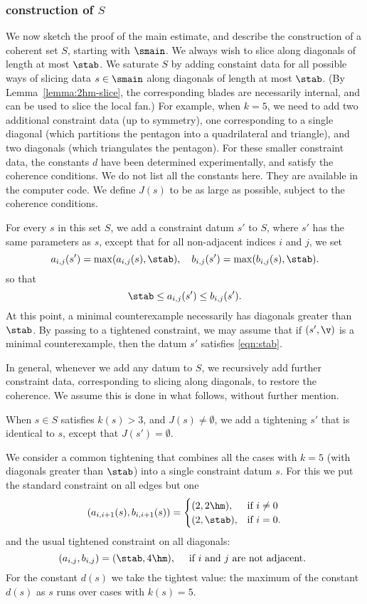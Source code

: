 \subsubsection{construction of $S$}

We now sketch the proof of the main estimate,
and describe the construction of a coherent set $S$, starting with $\smain$.
We always wish to slice along diagonals of length at most $\stab$. 
We saturate $S$ by adding constaint data for
all possible ways of  slicing data $s\in \smain$
along diagonals of length at most $\stab$.  (By Lemma~\ref{lemma:2hm-slice}, the
corresponding blades are necessarily internal, and can be used to
slice the local fan.)  For example, when $k=5$, we need to add two
additional constraint data (up to symmetry), one corresponding to a
single diagonal (which partitions the pentagon into a quadrilateral
and triangle), and two diagonals (which triangulates the pentagon).
For these smaller constraint data, the constants $d$ have been
determined experimentally, and satisfy the coherence conditions.  We
do not list all the constants here.  They are available in the
computer code.  We define $J(s)$ to be as large as possible, subject
to the coherence conditions.  

For every $s$ in this set $S$, 
we add a constraint datum $s'$ to $S$, where $s'$ has
the same parameters as $s$, except that for all non-adjacent indices $i$ and $j$,
we set
\begin{equation}\label{eqn:s'}
a_{i,j}(s') = \max(a_{i,j}(s),\stab),\quad b_{i,j}(s')=\max(b_{i,j}(s),\stab).
\end{equation}
so that
\begin{equation}\label{eqn:stab}
\stab \le a_{i,j}(s')\le b_{i,j}(s').
\end{equation}
At this point,  a minimal counterexample
necessarily has diagonals greater than $\stab$.  By passing to a tightened
constraint, we may assume that if $(s',\v)$ is a minimal counterexample,
then the datum $s'$ satisfies \eqref{eqn:stab}.

In general, whenever we add any datum to $S$, we recursively add
further constraint data, corresponding to slicing along diagonals,
to restore the coherence.  We assume this is done in what follows, without
further mention.

When $s\in S$ satisfies $k(s)>3$, and $J(s)\ne\emptyset$, we add a
tightening $s'$ that is identical to $s$, except that
$J(s')=\emptyset$.

We consider a common tightening that combines all the cases with $k=5$
(with diagonals greater than $\stab$) into a single constraint datum
$s$.  For this we put the standard constraint on all edges but one
\[
(a_{i,i+1}(s),b_{i,i+1}(s))=
\begin{cases}
(2,2\hm),&\text{if } i\ne 0\\
(2,\stab),&\text{if } i=0.
\end{cases}
\]
and the usual tightened constraint on all diagonals:
\[
(a_{i,j},b_{i,j})=(\stab,4\hm),\quad \text{ if $i$ and $j$ are not adjacent. }
\]
For the constant $d(s)$ we take the tightest value: the maximum of
the constant $d(s)$ as $s$ runs over cases with $k(s)=5$.


